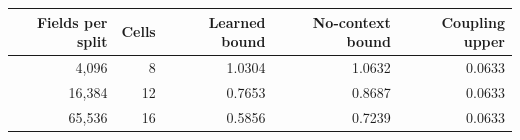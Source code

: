 \begin{tabular}{rrrrr}
\toprule
Fields per split & Cells & Learned bound & No-context bound & Coupling upper \\
\midrule
4,096 & 8 & 1.0304 & 1.0632 & 0.0633 \\
16,384 & 12 & 0.7653 & 0.8687 & 0.0633 \\
65,536 & 16 & 0.5856 & 0.7239 & 0.0633 \\
\bottomrule
\end{tabular}
